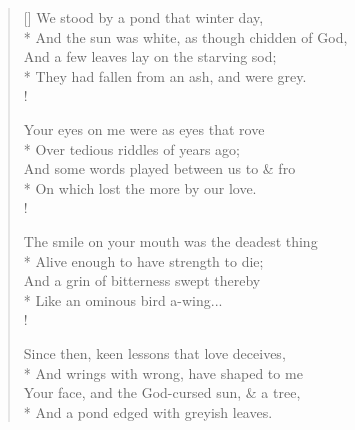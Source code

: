 \documentclass[MAIN]{subfiles}
\begin{document}
\settowidth{\versewidth}{And the sun was white, as though chidden of God,}
\begin{verse}[\versewidth]
We stood by a pond that winter day,\\*
\vin And the sun was white, as though chidden of God,\\
\vin And a few leaves lay on the starving sod;\\*
They had fallen from an ash, and were grey.\\!

Your eyes on me were as eyes that rove\\*
\vin Over tedious riddles of years ago;\\
\vin And some words played between us to \& fro\\*
On which lost the more by our love.\\!

The smile on your mouth was the deadest thing\\*
\vin Alive enough to have strength to die;\\
\vin And a grin of bitterness swept thereby\\*
Like an ominous bird a-wing...\\!

Since then, keen lessons that love deceives,\\*
\vin And wrings with wrong, have shaped to me\\
\vin Your face, and the God-cursed sun, \& a tree,\\*
And a pond edged with greyish leaves.
\end{verse}
\end{document}

